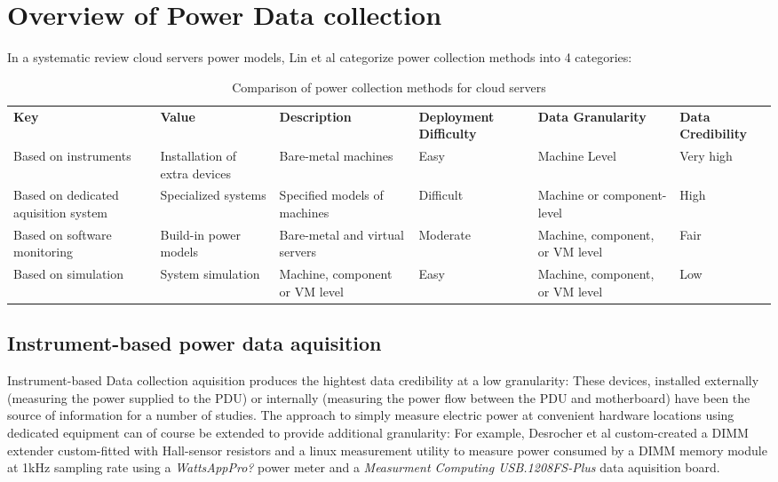 \section{Overview of Power Data collection}

In a systematic review cloud servers power models, Lin et al\parencite{lin2020taxonomy} categorize power collection methods into 4 categories:
\begin{table}[h]
    \tiny
    \begin{tabular}{ |p{2cm} | p{2cm} | p{2.5cm} | p{1.2cm} | p{2cm} | p{1.5cm} |} 
        \hline
        \textbf{Key} & \textbf{Value} & \textbf{Description} & \textbf{Deployment Difficulty} & \textbf{Data Granularity} & \textbf{Data Credibility}\\
        \Xhline{1.5pt}
        Based on instruments & Installation of extra devices & Bare-metal machines & Easy & Machine Level & Very high \\
        \hline
        Based on dedicated aquisition system & Specialized systems & Specified models of machines & Difficult & Machine or component-level & High \\
        \hline
        Based on software monitoring & Build-in power models & Bare-metal and virtual servers & Moderate & Machine, component, or VM level & Fair \\
        \hline
        Based on simulation & System simulation & Machine, component or VM level & Easy & Machine, component, or VM level & Low\\
        \hline
    \end{tabular}
    \caption[Comparison of power collection methods for cloud servers]{Comparison of power collection methods for cloud servers}
    \label{tab:power_collection_methods}
\end{table}



\subsection{Instrument-based power data aquisition}

Instrument-based Data collection aquisition produces the hightest data credibility at a low granularity: These devices, installed externally (measuring the power supplied to the PDU) or internally (measuring the power flow between the PDU and motherboard) have been the source of information for a number of studies. The approach to simply measure electric power at convenient hardware locations using dedicated equipment can of course be extended to provide additional granularity: For example, Desrocher et al\parencite{desrochers2016validation} custom-created a DIMM extender custom-fitted with Hall-sensor resistors and a linux measurement utility to measure power consumed by a DIMM memory module at 1kHz sampling rate using a \textit{WattsAppPro?} power meter and a \textit{Measurment Computing USB.1208FS-Plus} data aquisition board.

